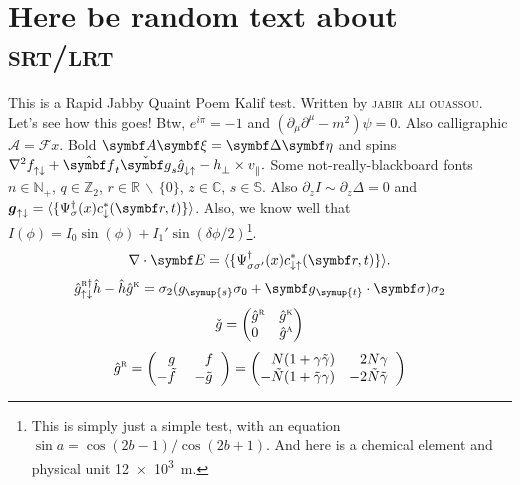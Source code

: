 \section{Here be random text about \textsc{srt/lrt}}\label{sec:test}
This is a Rapid Jabby Quaint Poem Kalif test.
Written by \textsc{jabir ali ouassou}.
Let's see how this goes! Btw, $e^{i\pi} = -1$ and $(\partial_\mu \partial^\mu - m^2) \psi = 0$.
Also calligraphic $\mathcal{A} = \mathcal{F}x$.
Bold $\B{A}\B{\xi} = \B{\Delta}\B{\eta}$ and spins $\nabla^2 f_{\uparrow\downarrow}^{\vphantom{\dagger}}+\hat{\B{f}}_t\check{\B{g}}_s\hat{g}_{\downarrow\uparrow}^{\vphantom{\dagger}} - h_\perp^{\vphantom{*}} \times v_\parallel^{\vphantom{*}}.$
Some not-really-blackboard fonts $n \in \mathbb{N}_+$, $q \in \mathbb{Z}_2$, $r \in \mathbb{R}\,\backslash\,\{0\}$, $z \in \mathbb{C}$, $s \in \mathbb{S}$. 
Also $\partial_z I \sim \partial_z \Delta = 0$ and $\boldsymbol{g}_{\up\dn} = \langle \{ \Psi^\dagger_\sigma(x) c^\ast_\dn(\B{r},t) \} \rangle$.
Also, we know well that $I(\phi) = I_0 \sin(\phi) + I_1' \sin(\delta\phi/2)$\footnote{This is simply just a simple test, with an equation $\sin a = \cos(2b-1)/\cos(2b+1)$. And here is a chemical element  and physical unit \SI{12e3}{m}. }.
\begin{equation}
  \nabla\cdot \B{E} = \langle \{ \Psi^\dagger_{\sigma\sigma'}(x) c^\ast_{\dn\up}(\B{r},t) \} \rangle.
\end{equation}
\begin{equation}
  \hat{g}^{\textsc{r}\dagger}_{\up\dn}\hat{h} - \hat{h}\hat{g}^{\textsc{k}} = \sigma_2(g_{\symup{s}} \sigma_0 + \B{g}_{\hspace{0.05em}\symup{t}}\cdot\B{\sigma})\sigma_2
\end{equation}
\begin{equation}
  \check{g} = \begin{pmatrix} \hat{g}^{\textsc{r}} & \hat{g}^{\textsc{k}} \\ 0^{\phantom{k}} & \hat{g}^{\textsc{a}} \end{pmatrix}
\end{equation}
\begin{equation}
  \hat{g}^{\textsc{r}} = \begin{pmatrix} \phantom{-}g\; & \phantom{-}f\;\; \\ -\tilde{f}\; & -\tilde{g}\;\; \end{pmatrix}
= \begin{pmatrix} \phantom{-}N(1+\gamma\tilde{\gamma}) & \phantom{-}2N\gamma\;\; \\ -\tilde{N}(1+\tilde{\gamma}\gamma) & -2\tilde{N}\tilde\gamma\;\; \end{pmatrix} 
\end{equation}
